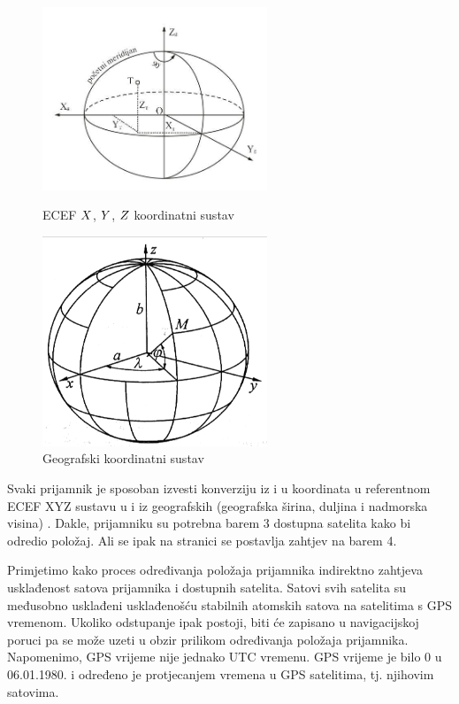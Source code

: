 \documentclass[a4paper,twoside,12pt]{memoir} %
\begin{document}
	
	\begin{figure}[H]
		\centering
		\begin{minipage}{0.45\textwidth}
			\centering
			\includegraphics[width=0.6\textwidth]{ECEFcro.png}
			\caption{ECEF $\mathnormal{X}$, $\mathnormal{Y}$, $\mathnormal{Z}$ koordinatni sustav \cite{geo:slikeSustava}}
			\label{Fig:na}
		\end{minipage}%
		\hspace{0.5cm}
		\begin{minipage}{0.45\textwidth}
			\centering
			\includegraphics[width=0.6\textwidth]{GEOcro.png}
			\caption{Geografski koordinatni sustav \cite{geo:slikeSustava}}
			\label{Fig:na1}
		\end{minipage}
	\end{figure}
	
	Svaki prijamnik je sposoban izvesti konverziju iz i u koordinata u referentnom ECEF XYZ sustavu 
	u i iz geografskih (geografska širina, duljina i nadmorska visina) \cite{GPS:overview}.
	Dakle, prijamniku su potrebna barem 3 dostupna satelita kako bi odredio položaj.
	Ali se ipak na stranici \pageref{stranica:4satelita} se postavlja zahtjev na barem 4. 
	
	Primjetimo kako proces određivanja položaja prijamnika
	indirektno zahtjeva usklađenost satova prijamnika i dostupnih satelita.
	Satovi svih satelita su međusobno usklađeni usklađenošću stabilnih atomskih satova na satelitima s GPS vremenom. Ukoliko odstupanje ipak postoji, biti će zapisano u navigacijskoj poruci pa se može uzeti u obzir prilikom određivanja položaja prijamnika.
	Napomenimo, GPS vrijeme nije jednako UTC vremenu. GPS vrijeme je bilo 0 u 06.01.1980. i određeno je protjecanjem vremena u GPS satelitima, tj. njihovim 
	satovima. 
	
\end{document}
